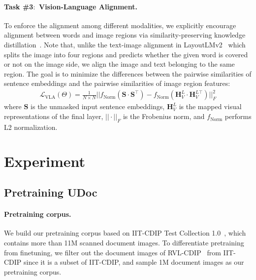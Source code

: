 \documentclass{article}
\begin{document}
	\paragraph{Task \#3$\colon$ Vision-Language Alignment.}
	To enforce the alignment among different modalities,  we explicitly encourage alignment between words and
	image regions via similarity-preserving knowledge distillation~\cite{tung2019similarity}. Note that, unlike the text-image alignment in LayoutLMv2~\cite{xu2020layoutlmv2} which split{s} the image into four regions and predict{s} whether the {given} word is covered or not on the image side, we align the image {and text belonging} to the same region. The goal is to minimize the {differences between the pairwise similarities of} sentence embeddings and the {pairwise similarities of image region features}:
	\begin{align}
		\label{eq:vlaloss}
		\mathcal{L}_{\text{VLA}}(\Theta) = \frac{1}{N\times N}   ||f_{\text{Norm}}({\mathbf{S}\cdot \mathbf{S}^{\top}}) - f_{\text{Norm}}(\mathbf{H}_V^L\cdot \mathbf{H}_V^{L\top})||^2_F
	\end{align}
	where {$\mathbf{S}$ is the unmasked input sentence embeddings, $\mathbf{H}_V^L$ is the mapped visual representations {of} the final layer, $||\cdot||_F$ is the Frobenius norm, and $f_{\text{Norm}}$ performs L2 normalization.}
	
	\section{Experiment}
	\subsection{Pretraining UDoc}
	\paragraph{Pretraining corpus.}
	We build our pretraining {corpus} based on IIT-CDIP Test Collection 1.0~\cite{10.1145/1148170.1148307}, which contains more than 11M scanned document images. To differentiate pretraining from finetuning, we filter out the document images of RVL-CDIP~\cite{harley2015icdar} from IIT-CDIP since it is a subset of IIT-CDIP, and sample 1M document images as our pretraining corpus.
	
\end{document}
